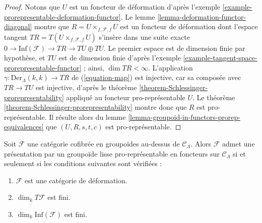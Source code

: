 \begin{proof}
Notons que $U$ est un foncteur de déformation d'après l'exemple
\ref{example-prorepresentable-deformation-functor}. Le lemme
\ref{lemma-deformation-functor-diagonal} montre que
$R = U \times_{f, \mathcal{F}, f} U$ est un foncteur de déformation dont
l'espace tangent $TR = T(U \times_{f, \mathcal{F}, f} U)$ s'insère dans une
suite exacte $0 \to \text{Inf}(\mathcal{F}) \to TR \to TU \oplus TU$. Le
premier espace est de dimension finie par hypothèse, et $TU$ est de dimension
finie d'après l'exemple
\ref{example-tangent-space-prorepresentable-functor} ; ainsi,
$\dim TR < \infty$. L'application
$\gamma : \text{Der}_\Lambda(k, k) \to TR$ de (\ref{equation-map}) est
injective, car sa composée avec $TR \to TU$ est injective, d'après le théorème
\ref{theorem-Schlessinger-prorepresentability} appliqué au foncteur
pro-représentable $U$. Le théorème
\ref{theorem-Schlessinger-prorepresentability} montre donc que $R$ est
pro-représentable. Il résulte alors du lemme
\ref{lemma-groupoid-in-functors-prorep-equivalences} que
$(U, R, s, t, c)$ est pro-représentable.
\end{proof}

\begin{theorem}
\label{theorem-presentation-deformation-groupoid}
Soit $\mathcal{F}$ une catégorie cofibrée en groupoïdes au-dessus de
$\mathcal{C}_\Lambda$. Alors $\mathcal{F}$ admet une présentation par un
groupoïde lisse pro-représentable en foncteurs sur $\mathcal{C}_\Lambda$ si et
seulement si les conditions suivantes sont vérifiées :
\begin{enumerate}
\item $\mathcal{F}$ est une catégorie de déformation.
\item $\dim_k T\mathcal{F}$ est fini.
\item $\dim_k \text{Inf}(\mathcal{F})$ est fini.
\end{enumerate}
\end{theorem}


